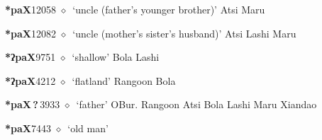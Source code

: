   \begin{list}{}{\leftmargin=1.5em \itemindent=-1.5em}
  \item {\footnotesize \textbf{*paX}}{\tiny 12058}
         $\diamond$~`uncle (father's younger brother)'
         Atsi 
\hspace{1ex}
         Maru 
  \item {\footnotesize \textbf{*paX}}{\tiny 12082}
\hspace{1ex}
         $\diamond$~`uncle (mother's sister's husband)'
         Atsi 
\hspace{1ex}
         Lashi 
\hspace{1ex}
         Maru 
  \item {\footnotesize \textbf{*ʔpaX}}{\tiny 9751}
\hspace{1ex}
         $\diamond$~`shallow'
         Bola 
\hspace{1ex}
         Lashi 
  \item {\footnotesize \textbf{*ʔpaX}}{\tiny 4212}
\hspace{1ex}
         $\diamond$~`flatland'
         Rangoon 
\hspace{1ex}
         Bola 
  \item {\footnotesize \textbf{*paX\,?\,}}{\tiny 3933}
\hspace{1ex}
         $\diamond$~`father'
         OBur. 
\hspace{1ex}
         Rangoon 
\hspace{1ex}
         Atsi 
\hspace{1ex}
         Bola 
\hspace{1ex}
         Lashi 
\hspace{1ex}
         Maru 
\hspace{1ex}
         Xiandao 
  \item {\footnotesize \textbf{*paX}}{\tiny 7443}
\hspace{1ex}
         $\diamond$~`old man'

\end{list}
